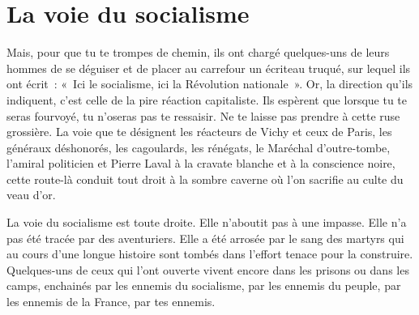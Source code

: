 \documentclass[french,twoside]{book} %
\begin{document}
\section[{La voie du socialisme}]{La voie du socialisme}
\noindent Mais, pour que tu te trompes de chemin, ils ont chargé quelques-uns de leurs hommes de se déguiser et de placer au carrefour un écriteau truqué, sur lequel ils ont écrit : « Ici le socialisme, ici la Révolution nationale ». Or, la direction qu’ils indiquent, c’est celle de la pire réaction capitaliste. Ils espèrent que lorsque tu te seras fourvoyé, tu n’oseras pas te ressaisir. Ne te laisse pas prendre à cette ruse grossière. La voie que te désignent les réacteurs de Vichy et ceux de Paris, les généraux déshonorés, les cagoulards, les rénégats, le Maréchal d’outre-tombe, l’amiral politicien et Pierre Laval à la cravate blanche et à la conscience noire, cette route-là conduit tout droit à la sombre caverne où l’on sacrifie au culte du veau d’or.\par
La voie du socialisme est toute droite. Elle n’aboutit pas à une impasse. Elle n’a pas été tracée par des aventuriers. Elle a été arrosée par le sang des martyrs qui au cours d’une longue histoire sont tombés dans l’effort tenace pour la construire. Quelques-uns de ceux qui l’ont ouverte vivent encore dans les prisons ou dans les camps, enchainés par les ennemis du socialisme, par les ennemis du peuple, par les ennemis de la France, par tes ennemis.
\end{document}
